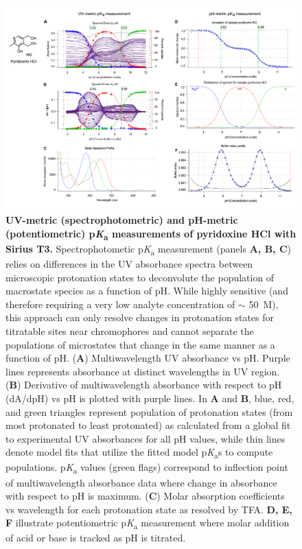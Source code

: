 \documentclass[9pt,lineno]{elife}
\newcommand{\pKa}{p\textit{K}\textsubscript{a}}
\begin{document}
\begin{figure}
\includegraphics[width=1.00\linewidth]{figures/UVmetric_vs_pHmetric_pKa_figure}
\caption{{\bf  UV-metric (spectrophotometric) and pH-metric (potentiometric) \pKa{} measurements of pyridoxine HCl with Sirius T3.} 
Spectrophotometic \pKa{} measurement (panels \textbf{A, B, C}) relies on differences in the UV absorbance spectra between microscopic protonation states to deconvolute the population of macrostate species as a function of pH.
While highly sensitive (and therefore requiring a very low analyte concentration of $\sim$ 50~\micro{}M), this approach can only resolve changes in protonation states for titratable sites near chromophores and cannot separate the populations of microstates that change in the same manner as a function of pH. 
(\textbf{A}) Multiwavelength UV absorbance vs pH. Purple lines represents absorbance at distinct wavelengths in UV region.
(\textbf{B}) Derivative of multiwavelength absorbance with respect to pH (dA/dpH) vs pH is plotted with purple lines. 
In \textbf{A} and \textbf{B}, blue, red, and green triangles represent population of protonation states (from most protonated to least protonated) as calculated from a global fit to experimental UV absorbances for all pH values, while thin lines denote model fits that utilize the fitted model \pKa{}s to compute populations.
\pKa{} values (green flags) correspond to inflection point of multiwavelength absorbance data where change in absorbance with respect to pH is maximum. 
(\textbf{C}) Molar absorption coefficients vs wavelength for each protonation state as resolved by TFA. 
\textbf{D, E, F} illustrate potentiometric \pKa{} measurement where molar addition of acid or base is tracked as pH is titrated.
}
\end{figure}
\end{document}

